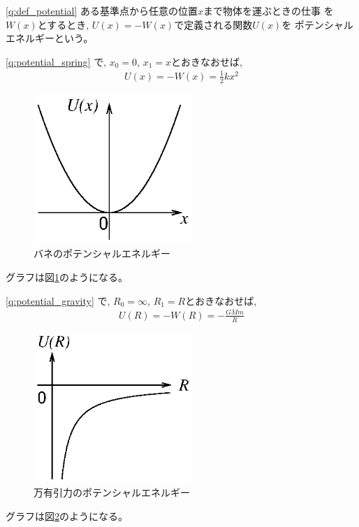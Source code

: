 % 
\ref{q:def_potential}
ある基準点から任意の位置$x$まで物体を運ぶときの仕事
を$W(x)$とするとき, $U(x)=-W(x)$で定義される関数$U(x)$を
ポテンシャルエネルギーという。
\vspace{0.2cm}

% 
\ref{q:potential_spring}
で, $x_0=0$, $x_1=x$とおきなおせば, 
\begin{eqnarray}
U(x)=-W(x)=\frac{1}{2}kx^2
\end{eqnarray}
\begin{figure}[h]
    \centering
    \includegraphics[width=6cm]{stringPE.eps}
    \caption{バネのポテンシャルエネルギー}\label{fig:stringPE}
\end{figure}
グラフは図\ref{fig:stringPE}のようになる。

% 
\ref{q:potential_gravity}
で, $R_0=\infty$, $R_1=R$とおきなおせば, 
\begin{eqnarray}
U(R)=-W(R)=-\frac{GMm}{R}
\end{eqnarray}
\begin{figure}[h]
    \centering
    \includegraphics[width=6cm]{gravityPE.eps}
    \caption{万有引力のポテンシャルエネルギー}\label{fig:gravityPE}
\end{figure}
グラフは図\ref{fig:gravityPE}のようになる。

